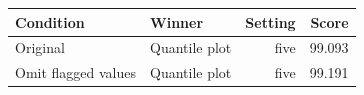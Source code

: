 \begin{tabular}{llrr}\toprule
Condition & Winner & Setting & Score\\\midrule
Original & Quantile plot & five & 99.093\\
Omit flagged values & Quantile plot & five & 99.191\\
\bottomrule\end{tabular}
